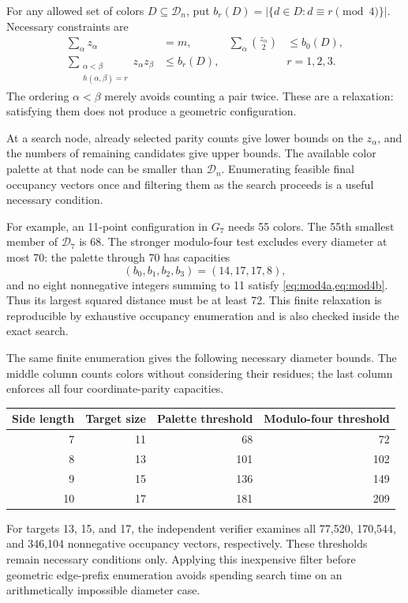 \documentclass[11pt,letterpaper]{article}
\theoremstyle{definition}
\newcommand{\calD}{\mathcal D}
\begin{document}
For any allowed set of colors \(D\subseteq\calD_n\), put
\(b_r(D)=|\{d\in D:d\equiv r\pmod4\}|\). Necessary constraints are
\begin{align}
 \sum_\alpha z_\alpha&=m, &
 \sum_\alpha\binom{z_\alpha}{2}&\le b_0(D),\label{eq:mod4a}\\
 \sum_{\substack{\alpha<\beta\\h(\alpha,\beta)=r}}
 z_\alpha z_\beta&\le b_r(D), &&r=1,2,3. \label{eq:mod4b}
\end{align}
The ordering \(\alpha<\beta\) merely avoids counting a pair twice.
These are a relaxation: satisfying them does not produce a geometric
configuration.

At a search node, already selected parity counts give lower bounds on
the \(z_\alpha\), and the numbers of remaining candidates give upper
bounds. The available color palette at that node can be smaller than
\(\calD_n\). Enumerating feasible final occupancy vectors once and
filtering them as the search proceeds is a useful necessary condition.

For example, an 11-point configuration in \(G_7\) needs 55 colors.
The 55th smallest member of \(\calD_7\) is 68. The stronger
modulo-four test excludes every diameter at most 70: the palette
through 70 has capacities
\[
 (b_0,b_1,b_2,b_3)=(14,17,17,8),
\]
and no eight nonnegative integers summing to 11 satisfy
\cref{eq:mod4a,eq:mod4b}. Thus its largest squared distance must be
at least 72. This finite relaxation is reproducible by exhaustive
occupancy enumeration and is also checked inside the exact search.

The same finite enumeration gives the following necessary diameter
bounds. The middle column counts colors without considering their
residues; the last column enforces all four coordinate-parity capacities.
\begin{center}
\begin{tabular}{rrrr}
\toprule
Side length&Target size&Palette threshold&Modulo-four threshold\\
\midrule
7&11&68&72\\
8&13&101&102\\
9&15&136&149\\
10&17&181&209\\
\bottomrule
\end{tabular}
\end{center}
For targets 13, 15, and 17, the independent verifier examines all
77,520, 170,544, and 346,104 nonnegative occupancy vectors,
respectively. These thresholds remain necessary conditions only.
Applying this inexpensive filter before geometric edge-prefix
enumeration avoids spending search time on an arithmetically
impossible diameter case.
\end{document}
